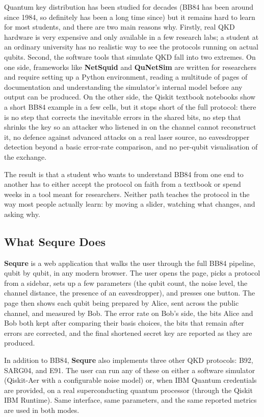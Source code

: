 \documentclass[12pt, a4paper]{article}
\begin{document}
Quantum key distribution has been studied for decades (BB84 has been around since 1984, so definitely has been a long time since) but it
remains hard to learn for most students, and there are two main
reasons why. Firstly, real QKD hardware is very expensive and only
available in a few research labs; a student at an ordinary
university has no realistic way to see the protocols running on
actual qubits. Second, the software tools that simulate QKD fall
into two extremes. On one side, frameworks like \textbf{NetSquid} and
\textbf{QuNetSim} are written for researchers and require setting up a
Python environment, reading a multitude of pages of documentation  and understanding the simulator's internal model before any output can be produced. On the other side, the Qiskit textbook notebooks show a short BB84 example in a few cells, but it stops short of the full protocol: there is no step that corrects the inevitable errors in the shared bits, no step that shrinks the key so an attacker who listened in on the channel cannot reconstruct it, no defence against advanced attacks on a real laser source, no eavesdropper detection beyond a basic error-rate comparison, and no per-qubit visualisation of the exchange.

The result is that a student who wants to understand BB84
from one end to another has to either accept the protocol on faith from a textbook or spend weeks in a tool meant for researchers. Neither path teaches the protocol in the way most people actually learn: by moving a slider, watching what changes, and asking why.

\subsection{What Sequre Does}
\label{sec:what-sequre-does}

\textbf{Sequre} is a web application that walks the user through
the full BB84 pipeline, qubit by qubit, in any modern browser.
The user opens the page, picks a protocol from a sidebar, sets up a few parameters (the qubit count, the noise level, the channel distance, the presence of an eavesdropper), and presses one button. The page then shows each qubit being prepared by Alice, sent across the public channel, and measured by Bob. The error rate on Bob's side, the bits Alice and Bob both kept after comparing their basis choices, the bits that remain after errors are corrected, and the final shortened secret key are reported as they are produced.

In addition to BB84, \textbf{Sequre} also implements three other
QKD protocols: B92, SARG04, and E91. The user can run any of
these on either a software simulator (Qiskit-Aer with a
configurable noise model) or, when IBM Quantum credentials are
provided, on a real superconducting quantum processor (through
the Qiskit IBM Runtime). Same interface, same parameters,
and the same reported metrics are used in both modes.
\end{document}
